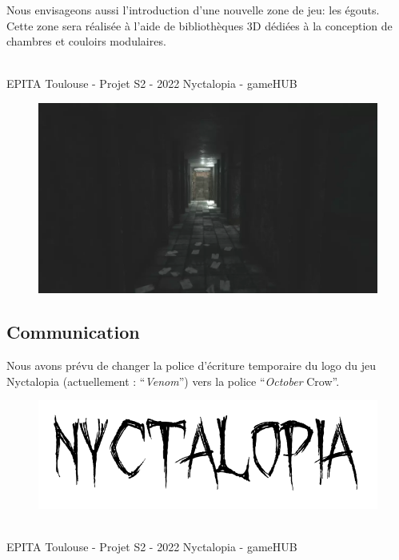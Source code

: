 Nous envisageons aussi l'introduction d'une nouvelle zone de jeu: les égouts. Cette zone sera réalisée à l'aide de bibliothèques 3D dédiées à la conception de chambres et couloirs modulaires.

\vfill
\noindent\makebox[\linewidth]{\rule{.8\paperwidth}{.6pt}}\\[0.2cm]
EPITA Toulouse - Projet S2 - 2022 \hfill Nyctalopia - gameHUB
\noindent\makebox[\linewidth]{\rule{.8\paperwidth}{.6pt}}

\newpage

\begin{figure}[H]
\centering
\begin{minipage}{.7\textwidth}
  \centering
  \centerline{\includegraphics[width=1\linewidth]{img/assets/egouts3.png}}
  \label{fig:egouts3}
\end{minipage}%
\end{figure}

\subsection{Communication}

Nous avons prévu de changer la police d'écriture temporaire du logo du jeu Nyctalopia (actuellement : ``\emph{Venom}'') vers la police ``\emph{October} Crow''.

\begin{figure}[H]
\centering
\begin{minipage}{.5\textwidth}
  \centering
  \centerline{\includegraphics[width=1.5\linewidth]{img/font.png}}
  \label{fig:octobercrowfont}
\end{minipage}%
\end{figure}

\vfill
\noindent\makebox[\linewidth]{\rule{.8\paperwidth}{.6pt}}\\[0.2cm]
EPITA Toulouse - Projet S2 - 2022 \hfill Nyctalopia - gameHUB
\noindent\makebox[\linewidth]{\rule{.8\paperwidth}{.6pt}}

\newpage